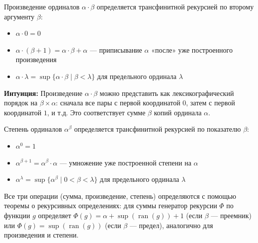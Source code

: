 \documentclass[11pt, a4paper]{extarticle}
\newcommand{\al}{\alpha}
\newcommand{\be}{\beta}
\newcommand{\la}{\lambda}
\newcommand{\ran}{\mathop{\mathrm{ran}}}
\begin{document}
\begin{definition}
Произведение ординалов $\al \cdot \be$ определяется трансфинитной рекурсией по второму аргументу $\be$:
\begin{itemize}
    \item $\al \cdot 0 = 0$
    \item $\al \cdot (\be + 1) = \al \cdot \be + \al$ — приписывание $\al$ «после» уже построенного произведения
    \item $\al \cdot \la = \sup\{\al \cdot \be \mid \be < \la\}$ для предельного ординала $\la$
\end{itemize}

\textbf{Интуиция:} Произведение $\al \cdot \be$ можно представить как лексикографический порядок на $\be \times \al$: сначала все пары с первой координатой $0$, затем с первой координатой $1$, и т.д. Это соответствует сумме $\be$ копий ординала $\al$.
\end{definition}

\begin{definition}
Степень ординалов $\al^{\be}$ определяется трансфинитной рекурсией по показателю $\be$:
\begin{itemize}
    \item $\al^0 = 1$
    \item $\al^{\be + 1} = \al^{\be} \cdot \al$ — умножение уже построенной степени на $\al$
    \item $\al^{\la} = \sup\{\al^{\be} \mid 0<\be < \la\}$ для предельного ординала $\la$
\end{itemize}

Все три операции (сумма, произведение, степень) определяются с помощью теоремы о рекурсивных определениях: для суммы генератор рекурсии $\Phi$ по функции $g$ определяет $\Phi(g) = \al + \sup(\ran(g)) + 1$ (если $\be$ — преемник) или $\Phi(g) = \sup(\ran(g))$ (если $\be$ — предел), аналогично для произведения и степени.
\end{definition}
\end{document}

